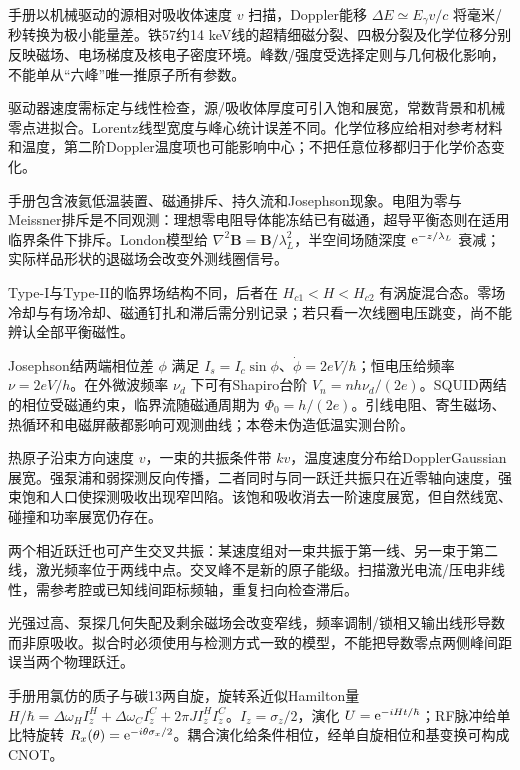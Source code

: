 手册以机械驱动的源相对吸收体速度 $v$ 扫描，Doppler能移 $\Delta E\simeq E_\gamma v/c$ 将毫米/秒转换为极小能量差。铁57约14 keV线的超精细磁分裂、四极分裂及化学位移分别反映磁场、电场梯度及核电子密度环境。峰数/强度受选择定则与几何极化影响，不能单从“六峰”唯一推原子所有参数。

驱动器速度需标定与线性检查，源/吸收体厚度可引入饱和展宽，常数背景和机械零点进拟合。Lorentz线型宽度与峰心统计误差不同。化学位移应给相对参考材料和温度，第二阶Doppler温度项也可能影响中心；不把任意位移都归于化学价态变化。

手册包含液氦低温装置、磁通排斥、持久流和Josephson现象。电阻为零与Meissner排斥是不同观测：理想零电阻导体能冻结已有磁通，超导平衡态则在适用临界条件下排斥。London模型给 $\nabla^2\mathbf B=\mathbf B/\lambda_L^2$，半空间场随深度 $\mathrm e^{-z/\lambda_L}$ 衰减；实际样品形状的退磁场会改变外测线圈信号。

Type-I与Type-II的临界场结构不同，后者在 $H_{c1}<H<H_{c2}$ 有涡旋混合态。零场冷却与有场冷却、磁通钉扎和滞后需分别记录；若只看一次线圈电压跳变，尚不能辨认全部平衡磁性。

Josephson结两端相位差 $\phi$ 满足 $I_s=I_c\sin\phi$、$\dot\phi=2eV/\hbar$；恒电压给频率 $\nu=2eV/h$。在外微波频率 $\nu_d$ 下可有Shapiro台阶 $V_n=nh\nu_d/(2e)$。SQUID两结的相位受磁通约束，临界流随磁通周期为 $\Phi_0=h/(2e)$。引线电阻、寄生磁场、热循环和电磁屏蔽都影响可观测曲线；本卷未伪造低温实测台阶。

热原子沿束方向速度 $v$，一束的共振条件带 $kv$，温度速度分布给DopplerGaussian展宽。强泵浦和弱探测反向传播，二者同时与同一跃迁共振只在近零轴向速度，强束饱和人口使探测吸收出现窄凹陷。该饱和吸收消去一阶速度展宽，但自然线宽、碰撞和功率展宽仍存在。

两个相近跃迁也可产生交叉共振：某速度组对一束共振于第一线、另一束于第二线，激光频率位于两线中点。交叉峰不是新的原子能级。扫描激光电流/压电非线性，需参考腔或已知线间距标频轴，重复扫向检查滞后。

光强过高、泵探几何失配及剩余磁场会改变窄线，频率调制/锁相又输出线形导数而非原吸收。拟合时必须使用与检测方式一致的模型，不能把导数零点两侧峰间距误当两个物理跃迁。

手册用氯仿的质子与碳13两自旋，旋转系近似Hamilton量 $H/\hbar=\Delta\omega_HI_z^H+\Delta\omega_CI_z^C+2\pi JI_z^HI_z^C$。$I_z=\sigma_z/2$，演化 $U=\mathrm e^{-iHt/\hbar}$；RF脉冲给单比特旋转 $R_x(\theta)=\mathrm e^{-i\theta\sigma_x/2}$。耦合演化给条件相位，经单自旋相位和基变换可构成CNOT。

